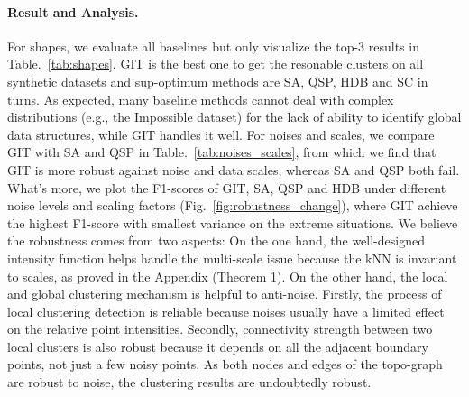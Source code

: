 \documentclass[letterpaper]{article} \usepackage{aaai22}  \usepackage{times}  \usepackage{helvet}  \usepackage{courier}  \usepackage[hyphens]{url}  \usepackage{graphicx} \urlstyle{rm} \def\UrlFont{\rm}  \usepackage{natbib}  \usepackage{caption} \DeclareCaptionStyle{ruled}{labelfont=normalfont,labelsep=colon,strut=off} \frenchspacing  \setlength{\pdfpagewidth}{8.5in}  \setlength{\pdfpageheight}{11in}  \usepackage{subfigure}
\begin{document}
\paragraph{Result and Analysis.} For shapes, we evaluate all baselines but only visualize the top-3 results in Table.~\ref{tab:shapes}. GIT is the best one to get the resonable clusters on all synthetic datasets and sup-optimum methods are SA, QSP, HDB and SC in turns. As expected, many baseline methods cannot deal with complex distributions (e.g., the Impossible dataset) for the lack of ability to identify global data structures, while GIT handles it well. For noises and scales, we compare GIT with SA and QSP in Table.~\ref{tab:noises_scales}, from which we find that GIT is more robust against noise and data scales, whereas SA and QSP both fail. What's more, we plot the F1-scores of GIT, SA, QSP and HDB under different noise levels and scaling factors (Fig.~\ref{fig:robustness_change}), where GIT achieve the highest F1-score with smallest variance on the extreme situations. We believe the robustness comes from two aspects:  On the one hand, the well-designed intensity function helps handle the multi-scale issue because the kNN is invariant to scales, as proved in the Appendix (Theorem 1). On the other hand, the local and global clustering mechanism is helpful to anti-noise. Firstly, the process of local clustering detection is reliable because noises usually have a limited effect on the relative point intensities. Secondly, connectivity strength between two local clusters is also robust because it depends on all the adjacent boundary points, not just a few noisy points. As both nodes and edges of the topo-graph are robust to noise, the clustering results are undoubtedly robust.
\end{document}
